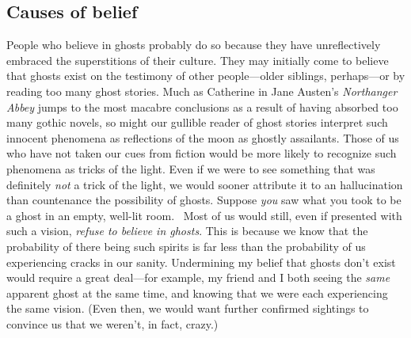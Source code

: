 \documentclass[11pt]{article}
\newenvironment{squote}{%
	\begin{spacing}{1}
	\begin{list}{}{%
	\setlength{\labelwidth}{0pt}%
	\rightmargin\leftmargin%
	}
	\item\relax
	}{%
	\end{list}%
	\end{spacing}
	}
\begin{document}
\begin{spacing}{1.5}
\subsection{Causes of belief}
\label{unger-cause}
People who believe in ghosts probably do so because they have unreflectively embraced the superstitions of their culture.  They may initially come to believe that ghosts exist on the testimony of other people---older siblings, perhaps---or by reading too many ghost stories.  Much as Catherine in Jane Austen's {\em Northanger Abbey} jumps to the most macabre conclusions as a result of having absorbed too many gothic novels, so might our gullible reader of ghost stories interpret such innocent phenomena as reflections of the moon as ghostly assailants.  Those of us who have not taken our cues from fiction would be more likely to recognize such phenomena as tricks of the light.  Even if we were to see something that was definitely {\em not} a trick of the light, we would sooner attribute it to an hallucination than countenance the possibility of ghosts.  Suppose {\em you} saw what you took to be a ghost in an empty, well-lit room.%
%
%
\ Most of us would still, even if presented with such a vision, {\em refuse to believe in ghosts}.  This is because we know that the probability of there being such spirits is far less than the probability of us experiencing cracks in our sanity.  Undermining my belief that ghosts don't exist would require a great deal---for example, my friend and I both seeing the {\em same} apparent ghost at the same time, and knowing that we were each experiencing the same vision.  (Even then, we would want further confirmed sightings to convince us that we weren't, in fact, crazy.)


\end{spacing}
\end{document}
